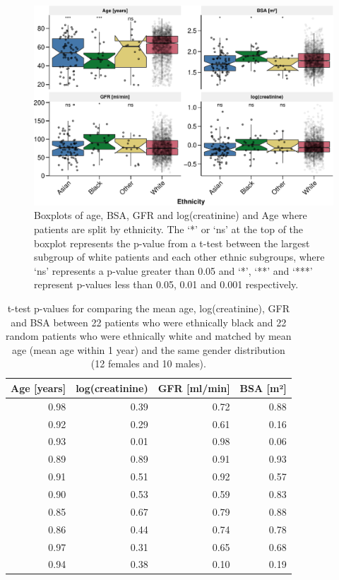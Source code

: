 \documentclass[11pt,]{article}
\begin{document}
\begin{figure}
\centering
\includegraphics{1_Validation_nonIDMS_resubmission_files/figure-latex/Ethnicity_boxplot-1.pdf}
\caption{\label{fig:boxplot_race}Boxplots of age, BSA, GFR and
log(creatinine) and Age where patients are split by ethnicity. The `*'
or `ns' at the top of the boxplot represents the p-value from a t-test
between the largest subgroup of white patients and each other ethnic
subgroups, where `ns' represents a p-value greater than 0.05 and `*',
`**' and `***' represent p-values less than 0.05, 0.01 and 0.001
respectively.}
\end{figure}

\begin{table}

\caption{\label{tab:ethnicity_matched_sampling}\label{tab:race_resample}t-test p-values for comparing the mean age, log(creatinine), GFR and BSA between 22 patients who were ethnically black and 22 random patients who were ethnically white and matched by mean age (mean age within 1 year) and the same gender distribution (12 females and 10 males).}
\centering
\begin{tabular}[t]{r|r|r|r}
\hline
Age [years] & log(creatinine) & GFR [ml/min] & BSA [m²]\\
\hline
0.98 & 0.39 & 0.72 & 0.88\\
\hline
0.92 & 0.29 & 0.61 & 0.16\\
\hline
0.93 & 0.01 & 0.98 & 0.06\\
\hline
0.89 & 0.89 & 0.91 & 0.93\\
\hline
0.91 & 0.51 & 0.92 & 0.57\\
\hline
0.90 & 0.53 & 0.59 & 0.83\\
\hline
0.85 & 0.67 & 0.79 & 0.88\\
\hline
0.86 & 0.44 & 0.74 & 0.78\\
\hline
0.97 & 0.31 & 0.65 & 0.68\\
\hline
0.94 & 0.38 & 0.10 & 0.19\\
\hline
\end{tabular}
\end{table}
\end{document}

